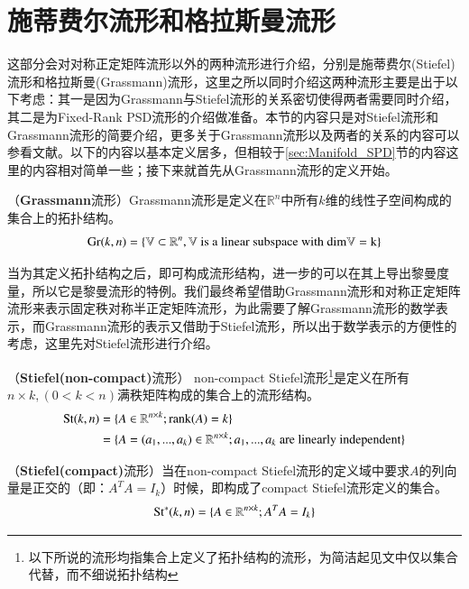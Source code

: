 \section{施蒂费尔流形和格拉斯曼流形}
\label{sec:Grassmann_Manifold}
这部分会对对称正定矩阵流形以外的两种流形进行介绍，分别是施蒂费尔(Stiefel)流形和格拉斯曼(Grassmann)流形，这里之所以同时介绍这两种流形主要是出于以下考虑：其一是因为Grassmann与Stiefel流形的关系密切使得两者需要同时介绍，其二是为Fixed-Rank PSD流形的介绍做准备。本节的内容只是对Stiefel流形和Grassmann流形的简要介绍，更多关于Grassmann流形以及两者的关系的内容可以参看文献\cite{Grassmann}。以下的内容以基本定义居多，但相较于\ref{sec:Manifold_SPD}节的内容这里的内容相对简单一些；接下来就首先从Grassmann流形的定义开始。
\begin{definition}
\label{Grassmann_def}
{\heiti （\textbf{Grassmann}流形）}Grassmann流形是定义在$\mathbb{R}^n$中所有$k$维的线性子空间构成的集合上的拓扑结构。
\begin{equation}
{\rm Gr}(k,n)=\{\mathbb{V} \subset \mathbb{R}^n,\mathbb{V}\text{ is a linear subspace with }\rm{dim}\mathbb{V}=k\}
\end{equation}
\end{definition}
当为其定义拓扑结构之后，即可构成流形结构，进一步的可以在其上导出黎曼度量\cite{Grassmann}，所以它是黎曼流形的特例。我们最终希望借助Grassmann流形和对称正定矩阵流形来表示固定秩对称半正定矩阵流形，为此需要了解Grassmann流形的数学表示，而Grassmann流形的表示又借助于Stiefel流形，所以出于数学表示的方便性的考虑，这里先对Stiefel流形进行介绍。
\begin{definition}
\label{Stiefel_nonCompact_def}
{\heiti （\textbf{Stiefel(non-compact)}流形）} non-compact Stiefel流形\footnote{以下所说的流形均指集合上定义了拓扑结构的流形，为简洁起见文中仅以集合代替，而不细说拓扑结构}是定义在所有$n\times k,(0<k<n)$满秩矩阵构成的集合上的流形结构。
\begin{equation}
\begin{split}
{\rm St}(k,n)&=\{A \in \mathbb{R}^{n\times k};{\rm rank}(A)=k\}\\
&=\{A=(a_1,...,a_k)\in \mathbb{R}^{n\times k}; a_1,...,a_k \text{ are linearly independent}\}
\end{split}
\end{equation}
\end{definition}
\begin{definition}
\label{Stiefel_Compact_def}
{\heiti （\textbf{Stiefel(compact)}流形）}当在non-compact Stiefel流形\footnotemark[\value{footnote}]的定义域中要求$A$的列向量是正交的（即：$A^{T}A=I_k$）时候，即构成了compact Stiefel流形定义的集合。
\begin{equation}
{\rm St}^{*}(k,n)=\{A\in\mathbb{R}^{n\times k};A^{T}A=I_k\}
\end{equation}
\end{definition}
